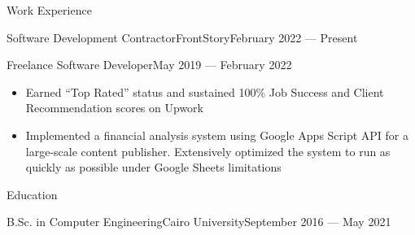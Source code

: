 \documentclass[]{mcdowellcv}
\begin{document}
	\makeheader
	
	
	\begin{cvsection}{Work Experience}
		\begin{cvsubsection}{Software Development Contractor}{FrontStory}{February 2022 — Present}
		\end{cvsubsection}
		\begin{cvsubsection}{Freelance Software Developer}{}{May 2019 — February 2022}
			\begin{itemize}
				\item Earned “Top Rated” status and sustained 100\% Job Success and Client Recommendation scores on Upwork
				\item Implemented a financial analysis system using Google Apps Script API for a large-scale content publisher. Extensively optimized the system to run as quickly as possible under Google Sheets limitations
			\end{itemize}
		\end{cvsubsection}
	\end{cvsection}
	
	\begin{cvsection}{Education}
		\begin{cvsubsection}{B.Sc. in Computer Engineering}{Cairo University}{September 2016 — May 2021}\end{cvsubsection}
	\end{cvsection}
	\vspace*{-12pt}
	
\end{document}
